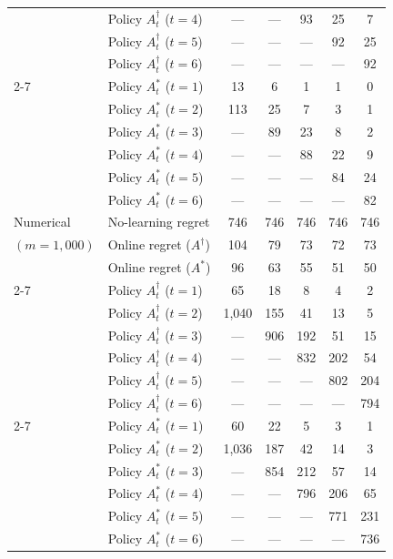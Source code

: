 \documentclass[blindrev]{informs3noheader}
\begin{document}
\begin{table}[h!]
\begin{tabular}{llccccc}
        &	Policy $A^\dagger_t$ ($t=4$)	&	---		&	---		&	93		&	25		&	7		\\
        &	Policy $A^\dagger_t$ ($t=5$)	&	---		&	---		&	---		&	92		&	25		\\
        &	Policy $A^\dagger_t$ ($t=6$)	&	---		&	---		&	---		&	---		&	92		\\
\cmidrule{2-7}
        &	Policy $A^*_t$ ($t=1$)	&	13		&	6		&	1		&	1		&	0		\\
        &	Policy $A^*_t$ ($t=2$)	&	113		&	25		&	7		&	3		&	1		\\
        &	Policy $A^*_t$ ($t=3$)	&	---		&	89		&	23		&	8		&	2		\\
        &	Policy $A^*_t$ ($t=4$)	&	---		&	---		&	88		&	22		&	9		\\
        &	Policy $A^*_t$ ($t=5$)	&	---		&	---		&	---		&	84		&	24		\\
        &	Policy $A^*_t$ ($t=6$)	&	---		&	---		&	---		&	---		&	82		\\
\hline
Numerical	&	No-learning regret	&	746		&	746		&	746		&	746		&	746		\\
$(m=1,000)$	&	Online regret ($A^\dagger$)		&	104		&	79		&	73		&	72		&	73		\\
        &	Online regret ($A^*$)		&	96		&	63		&	55		&	51		&	50		\\
\cmidrule{2-7}
        &	Policy $A^\dagger_t$ ($t=1$)	&	65		&	18		&	8		&	4		&	2		\\
        &	Policy $A^\dagger_t$ ($t=2$)	&	1,040	&	155		&	41		&	13		&	5		\\
        &	Policy $A^\dagger_t$ ($t=3$)	&	---		&	906		&	192		&	51		&	15		\\
        &	Policy $A^\dagger_t$ ($t=4$)	&	---		&	---		&	832		&	202		&	54		\\
        &	Policy $A^\dagger_t$ ($t=5$)	&	---		&	---		&	---		&	802		&	204		\\
        &	Policy $A^\dagger_t$ ($t=6$)	&	---		&	---		&	---		&	---		&	794		\\
\cmidrule{2-7}
        &	Policy $A^*_t$ ($t=1$)	&	60		&	22		&	5		&	3		&	1		\\
        &	Policy $A^*_t$ ($t=2$)	&	1,036	&	187		&	42		&	14		&	3		\\
        &	Policy $A^*_t$ ($t=3$)	&	---		&	854		&	212		&	57		&	14		\\
        &	Policy $A^*_t$ ($t=4$)	&	---		&	---		&	796		&	206		&	65		\\
        &	Policy $A^*_t$ ($t=5$)	&	---		&	---		&	---		&	771		&	231		\\
        &	Policy $A^*_t$ ($t=6$)	&	---		&	---		&	---		&	---		&	736		\\
\bottomrule
\end{tabular}
\end{table}
\end{document}
